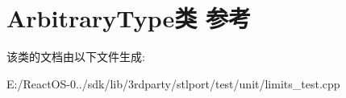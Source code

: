 \hypertarget{class_arbitrary_type}{}\section{Arbitrary\+Type类 参考}
\label{class_arbitrary_type}


该类的文档由以下文件生成\+:\begin{DoxyCompactItemize}
\item 
E\+:/\+React\+O\+S-\/0../sdk/lib/3rdparty/stlport/test/unit/limits\+\_\+test.\+cpp\end{DoxyCompactItemize}
